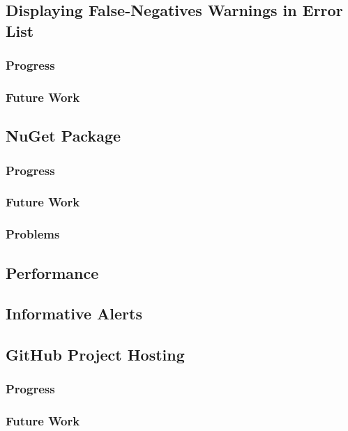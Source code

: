 \documentclass[10pt,draftclsnofoot,onecolumn]{IEEEtran}
\begin{document}
\subsection{Displaying False-Negatives Warnings in Error List}
\subsubsection{Progress}


\subsubsection{Future Work}


\subsection{NuGet Package}
\subsubsection{Progress}


\subsubsection{Future Work}


\subsubsection{Problems}



\subsection{Performance}


\subsection{Informative Alerts}


\subsection{GitHub Project Hosting}
\subsubsection{Progress}


\subsubsection{Future Work}
\end{document}
